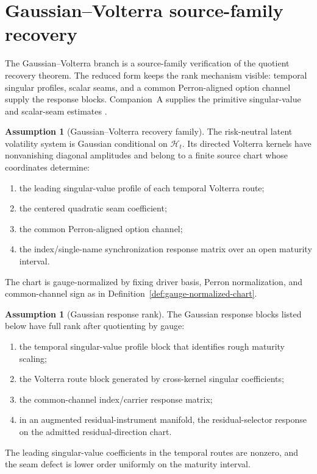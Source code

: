 \documentclass[11pt,a4paper]{amsart}
\theoremstyle{plain}
\theoremstyle{definition}
\newtheorem{assumption}[theorem]{Assumption}
\theoremstyle{remark}
\newcommand{\cH}{\mathcal{H}}
\begin{document}
\section{Gaussian--Volterra source-family recovery}\label{sec:gaussian}

The Gaussian--Volterra branch is a source-family verification of the quotient recovery theorem.
The reduced form keeps the rank mechanism visible: temporal singular profiles, scalar seams, and a
common Perron-aligned option channel supply the response blocks.  Companion~A supplies the primitive
singular-value and scalar-seam estimates \cite{vidal2026gaussianseams}.

\begin{assumption}[Gaussian--Volterra recovery family]\label{ass:gv-family}
The risk-neutral latent volatility system is Gaussian conditional on \(\cH_t\).  Its directed
Volterra kernels have nonvanishing diagonal amplitudes and belong to a finite source chart whose
coordinates determine:
\begin{enumerate}[leftmargin=2em]
\item the leading singular-value profile of each temporal Volterra route;
\item the centered quadratic seam coefficient;
\item the common Perron-aligned option channel;
\item the index/single-name synchronization response matrix over an open maturity interval.
\end{enumerate}
The chart is gauge-normalized by fixing driver basis, Perron normalization, and common-channel
sign as in Definition~\ref{def:gauge-normalized-chart}.
\end{assumption}

\begin{assumption}[Gaussian response rank]\label{ass:gv-rank}
The Gaussian response blocks listed below have full rank after quotienting by gauge:
\begin{enumerate}[leftmargin=2em]
\item the temporal singular-value profile block that identifies rough maturity scaling;
\item the Volterra route block generated by cross-kernel singular coefficients;
\item the common-channel index/carrier response matrix;
\item in an augmented residual-instrument manifold, the residual-selector response on the admitted
residual-direction chart.
\end{enumerate}
The leading singular-value coefficients in the temporal routes are nonzero, and the seam defect is
lower order uniformly on the maturity interval.
\end{assumption}
\end{document}
